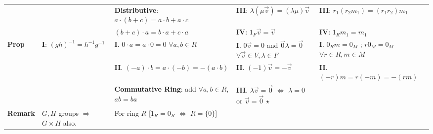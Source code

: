\documentclass[9pt]{article}
\begin{document}
{\begin{longtable}{l@{\hskip 2pt}||l|l|l|l}
                         &                                                                               & \textbf{Distributive}: $a\cdot(b+c)=a\cdot b+a\cdot c$                             & \textbf{III}: $\lambda(\mu\vec{v})=(\lambda\mu)\vec{v}$                                                                    & \textbf{III}: $r_1(r_2m_1)=(r_1r_2)m_1$                                                   \\
                         &                                                                               & \qquad \qquad \qquad $(b+c)\cdot a=b\cdot a+c\cdot a$                              & \textbf{IV}: $1_F\vec{v}=\vec{v}$                                                                                          & \textbf{IV}: $1_Rm_1=m_1$                                                                 \\
    \hline
    \textbf{\tiny Prop}  & \textbf{I}: $(gh)^{-1}=h^{-1}g^{-1}$                                          & \textbf{I}. $0\cdot a=a\cdot 0=0$ \hfill{\tiny $\forall a,b\in R$}                 & \textbf{I}. $0\vec{v}=0$ and $\vec{0}\lambda=\vec{0}$ \hfill{\tiny $\forall \vec{v}\in V,\lambda\in F$}                    & \textbf{I}. $0_Rm=0_M$ ; $r0_M=0_M$ \hfill{\tiny $\forall r\in R,m\in M$}                 \\
                         &                                                                               & \textbf{II}. $(-a)\cdot b=a\cdot(-b)=-(a\cdot b)$                                  & \textbf{II}. $(-1)\vec{v}=-\vec{v}$                                                                                        & \textbf{II}. $(-r)m=r(-m)=-(rm)$                                                          \\
                         &                                                                               & {\tiny \textbf{Commutative Ring}: add $\forall a,b\in R$, $ab=ba$}                 & \textbf{III}. $\lambda\vec{v}=\vec{0}$ $\Leftrightarrow$ $\lambda=0$ or $\vec{v}=\vec{0}$ $\star$                          &                                                                                           \\
    \hline
    \textbf{\tiny Remark}& $G,H$ groups $\Rightarrow$ $G\times H$ also.                                  & For ring $R$ [$1_R=0_R$ $\Leftrightarrow$ $R=\{0\}$]                               &                                                                                                                            &                                                                                           \\

\end{longtable}}
\end{document}
